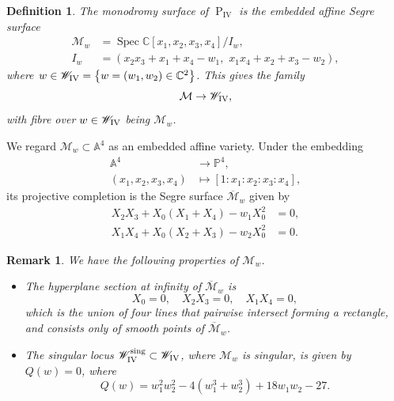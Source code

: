 \documentclass[a4paper,reqno]{amsart}
\numberwithin{equation}{section}
\newcommand{\C}{\mathbb{C}}
\newcommand{\p}{\mathbb{P}}
\newcommand{\pain}[1]{\operatorname{P}_{\mathrm{#1}}}
\DeclareMathOperator{\Spec}{Spec}
\newtheorem{definition}[theorem]{Definition}
\newtheorem{remark}[theorem]{Remark}
\numberwithin{equation}{section}
\begin{document}
\begin{definition} \label{def:monodromysurfacePIV}
    The monodromy surface of $\pain{IV}$ is the embedded affine Segre surface
    \begin{equation*}
    \begin{aligned}
        \mathcal{M}_w &= \Spec \C[x_1,x_2,x_3,x_4]/I_{w}, \\  
        I_w &= (x_2x_3+x_1+x_4-w_1, \,\,x_1 x_4+x_2+x_3-w_2),
    \end{aligned}
    \end{equation*}
    where $w \in \mathscr{W}_{\rm{IV}} = \left\{ w=(w_1,w_2) \in \C^2 \right\}$.
    This gives the family
    \begin{equation*}
        \mathcal{M}\to\mathscr{W}_{\rm{IV}},
    \end{equation*}
    with fibre over $w\in\mathscr{W}_{\rm{IV}}$ being $\mathcal{M}_{w}$.
\end{definition}
We regard $\mathcal{M}_w\subset\mathbb{A}^4$ as an embedded affine variety.
Under the embedding 
        \begin{equation*}
        \begin{aligned}
            \mathbb{A}^4 &\to \p^4,\\
            (x_1,x_2,x_3,x_4) &\mapsto [1: x_1:x_2:x_3:x_4],
        \end{aligned}
        \end{equation*}
        its projective completion is the Segre surface $\overline{\mathcal{M}}_w$ given by 
        \begin{equation*}
            \begin{aligned}
            X_2X_3+X_0(X_1+X_4)-w_1 X_0^2 &= 0, \\
            X_1 X_4+ X_0(X_2+X_3)-w_2 X_0^2 &= 0.           
            \end{aligned}
        \end{equation*}
\begin{remark}
We have the following properties of $\mathcal{M}_w$.
    \begin{itemize}
        \item The hyperplane section at infinity of $\overline{\mathcal{M}}_w$ is 
        \begin{equation*}
            X_0 = 0, \quad X_2 X_3 = 0 ,\quad X_1 X_4 = 0,
        \end{equation*}
        which is the union of four lines that pairwise intersect forming a rectangle, and consists only of smooth points of $\overline{\mathcal{M}}_w$.
        \item The singular locus $\mathscr{W}^{\operatorname{sing}}_{\rm{IV}}\subset \mathscr{W}_{\rm{IV}}$, where $\mathcal{M}_w$ is singular, is given by $Q(w)=0$, where
        \begin{equation*} 
    Q(w)= w_1^2 w_2^2 - 4 ( w_1^3+ w_2^3) +18 w_1 w_2-27.
    \end{equation*}
    \end{itemize}
\end{remark}
\end{document}
